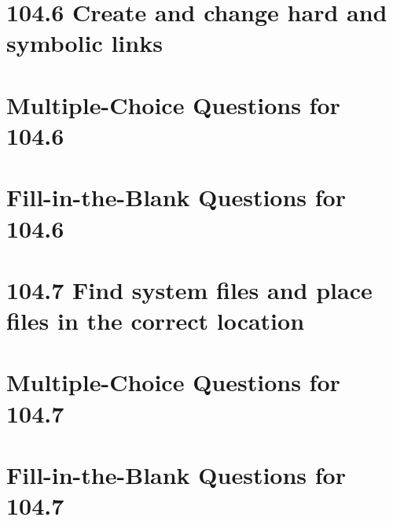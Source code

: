 \documentclass[a4paper]{report}
\begin{document}
\newpage
\section*{104.6 Create and change hard and symbolic links}

\newpage
\section*{Multiple-Choice Questions for 104.6}

\newpage
\section*{Fill-in-the-Blank Questions for 104.6}

\newpage
\section*{104.7 Find system files and place files in the correct location}

\newpage
\section*{Multiple-Choice Questions for 104.7}

\newpage
\section*{Fill-in-the-Blank Questions for 104.7}
\end{document}
